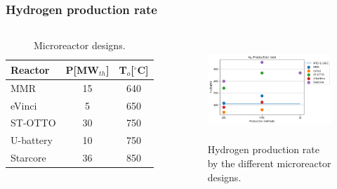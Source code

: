 \begin{frame}
\frametitle{Hydrogen production rate}
\begin{columns}
    \column[t]{5cm}
	\begin{table}[!htb]
		\centering
	    \caption{Microreactor designs.}
		\begin{tabular}{lcc}
		\hline
		Reactor                                      & P[MW$_{th}$] & T$_o$[$^\circ$C] \\ \hline
		MMR \cite{usnc_mmr_2019}  		             & 15           & 640              \\
		eVinci \cite{hernandez_micro_2019}           & 5            & 650              \\
		ST-OTTO \cite{harlan_x-energy_2018}          & 30           & 750              \\
		U-battery \cite{ding_design_2011}            & 10           & 750              \\
		Starcore \cite{star_core_nuclear_star_2015}  & 36           & 850              \\ \hline
        \end{tabular}
	\end{table}

	\column[t]{6.5cm}
	\begin{figure}[htbp!]
		\begin{center}
			\includegraphics[height=3.8cm]{images/reactors-by-hour1}
		\end{center}
		\caption{Hydrogen production rate by the different microreactor designs.}
	\end{figure}
\end{columns}
\end{frame}

